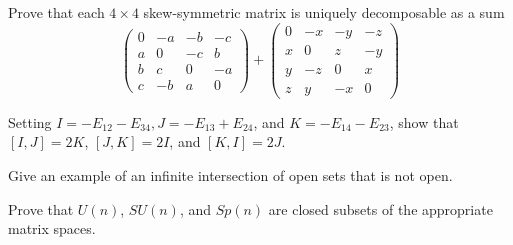 \documentclass[12pt,onecolumn]{article}
\begin{document}
\begin{answer}

\end{answer}
\begin{exercise}[6.5.4]
 Prove that each $4\times 4$ skew-symmetric matrix is uniquely decomposable as a sum 
 \[
 \begin{pmatrix}
 0 & -a & -b & -c \\
 a & 0 & -c & b \\
 b & c & 0 & -a \\
 c & - b & a & 0
 \end{pmatrix} +
 \begin{pmatrix}
 0 & -x & -y & -z \\
 x & 0 & z & -y \\
 y & -z & 0 & x \\
 z & y & -x & 0 
 \end{pmatrix}
 \]
\end{exercise}
\begin{answer}

\end{answer}
\begin{exercise}[6.5.5]
Setting $I =−E_{12}−E_{34}, J =−E_{13}+E_{24}$, and $K =−E_{14}−E_{23}$, show that $[I,J]=2K$, $[J,K]=2I$, and $[K,I]=2J$. 
\end{exercise}
\begin{answer}

\end{answer}
\begin{exercise}[8.1.3]
Give an example of an inﬁnite intersection of open sets that is not open. 
\end{exercise}
\begin{answer}

\end{answer}
\begin{exercise}[8.2.1]
 Prove that $U(n)$, $SU(n)$, and $Sp(n)$ are closed subsets of the appropriate matrix spaces. 
\end{exercise}
\begin{answer}

\end{answer}
\end{document}
